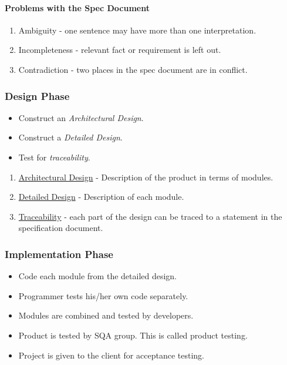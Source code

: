 \documentclass{report}
\begin{document}
			\paragraph{Problems with the Spec Document}
			\begin{enumerate}
				\item Ambiguity - one sentence may have more than one interpretation.
				\item Incompleteness - relevant fact or requirement is left out.
				\item Contradiction - two places in the spec document are in conflict.
			\end{enumerate}
		\subsubsection{Design Phase}
			\begin{itemize}
				\item Construct an \emph{Architectural Design}.
				\item Construct a \emph{Detailed Design}.
				\item Test for \emph{traceability}.
			\end{itemize}
			\begin{enumerate}
				\item \underline{Architectural Design} - Description of the product in terms of modules.
				\item \underline{Detailed Design} - Description of each module.
				\item \underline{Traceability} - each part of the design can be traced to a statement in the specification document.
			\end{enumerate}
		\subsubsection{Implementation Phase}
			\begin{itemize}
				\item Code each module from the detailed design.
				\item Programmer tests his/her own code separately.
				\item Modules are combined and tested by developers.
				\item Product is tested by SQA group. This is called product testing.
				\item Project is given to the client for acceptance testing.
			\end{itemize}
\end{document}
